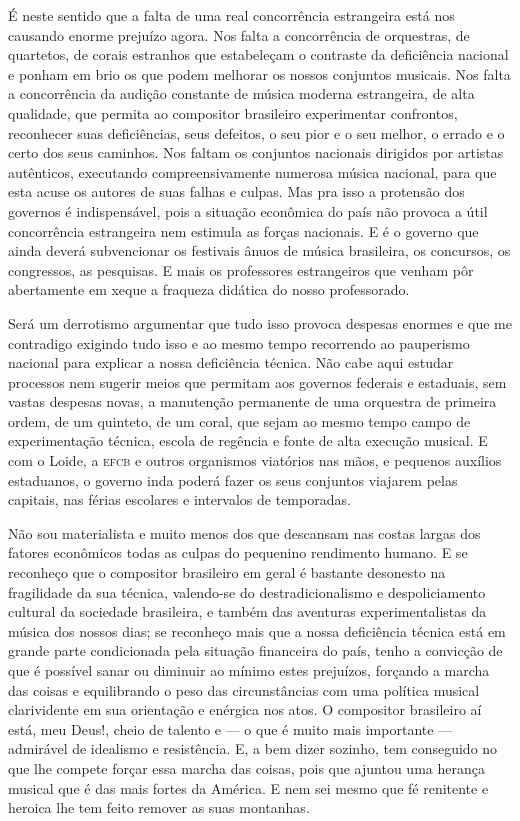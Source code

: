 É neste sentido que a falta de uma real concorrência estrangeira está
nos causando enorme prejuízo agora. Nos falta a concorrência de
orquestras, de quartetos, de corais estranhos que estabeleçam o
contraste da deficiência nacional e ponham em brio os que podem melhorar
os nossos conjuntos musicais. Nos falta a concorrência da audição
constante de música moderna estrangeira, de alta qualidade, que permita
ao compositor brasileiro experimentar confrontos, reconhecer suas
deficiências, seus defeitos, o seu pior e o seu melhor, o errado e o
certo dos seus caminhos. Nos faltam os conjuntos nacionais dirigidos por
artistas autênticos, executando compreensivamente numerosa música
nacional, para que esta acuse os autores de suas falhas e culpas. Mas
pra isso a protensão dos governos é indispensável, pois a situação
econômica do país não provoca a útil concorrência estrangeira nem
estimula as forças nacionais. E é o governo que ainda deverá
subvencionar os festivais ânuos de música brasileira, os concursos, os
congressos, as pesquisas. E mais os professores estrangeiros que venham
pôr abertamente em xeque a fraqueza didática do nosso professorado.

Será um derrotismo argumentar que tudo isso provoca despesas enormes e
que me contradigo exigindo tudo isso e ao mesmo tempo recorrendo ao
pauperismo nacional para explicar a nossa deficiência técnica. Não cabe
aqui estudar processos nem sugerir meios que permitam aos governos
federais e estaduais, sem vastas despesas novas, a manutenção permanente
de uma orquestra de primeira ordem, de um quinteto, de um coral, que
sejam ao mesmo tempo campo de experimentação técnica, escola de regência
e fonte de alta execução musical. E com o Loide, a \textsc{efcb} e outros
organismos viatórios nas mãos, e pequenos auxílios estaduanos, o governo
inda poderá fazer os seus conjuntos viajarem pelas capitais, nas férias
escolares e intervalos de temporadas.

Não sou materialista e muito menos dos que descansam nas costas largas
dos fatores econômicos todas as culpas do pequenino rendimento humano. E
se reconheço que o compositor brasileiro em geral é bastante desonesto
na fragilidade da sua técnica, valendo-se do destradicionalismo e
despoliciamento cultural da sociedade brasileira, e também das aventuras
experimentalistas da música dos nossos dias; se reconheço mais que a
nossa deficiência técnica está em grande parte condicionada pela
situação financeira do país, tenho a convicção de que é possível sanar
ou diminuir ao mínimo estes prejuízos, forçando a marcha das coisas e
equilibrando o peso das circunstâncias com uma política musical
clarividente em sua orientação e enérgica nos atos. O compositor
brasileiro aí está, meu Deus!, cheio de talento e --- o que é muito mais
importante --- admirável de idealismo e resistência. E, a bem dizer
sozinho, tem conseguido no que lhe compete forçar essa marcha das
coisas, pois que ajuntou uma herança musical que é das mais fortes da
América. E nem sei mesmo que fé renitente e heroica lhe tem feito
remover as suas montanhas.




